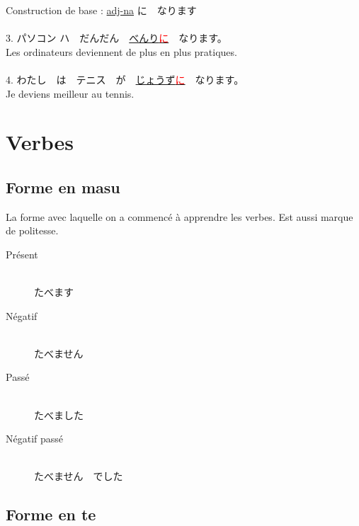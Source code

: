 \documentclass[11pt]{report}
\newenvironment{Japanese}{%
\CJKfamily{min}%
\CJKtilde  
\CJKnospace}{}
\begin{document}
\begin{CJK}{UTF8}{}  
\begin{Japanese}
	Construction de base : \underline{adj-na} に　なります \\ \\
	3. パソコン ハ　だんだん　\underline{べんり\textcolor{red}{に}}　なります。 \\
	Les ordinateurs deviennent de plus en plus pratiques. \\ \\
	4. わたし　は　テニス　が　\underline{じょうず\textcolor{red}{に}}　なります。 \\
	Je deviens meilleur au tennis.
\end{Japanese}  
\end{CJK}

\chapter{Verbes}

\section{Forme en masu}

\begin{CJK}{UTF8}{}  
\begin{Japanese}
	La forme avec laquelle on a commenc\'e \`a apprendre les verbes. Est aussi marque de politesse. \\
	\begin{description}
		\item[Présent] \hfill \\
		たべます
		\item[Négatif] \hfill \\
		たべません
		\item[Passé] \hfill \\
		たべました
		\item[Négatif passé] \hfill \\
		たべません　でした
	\end{description}
\end{Japanese}  
\end{CJK}

\section{Forme en te}
\end{document}
